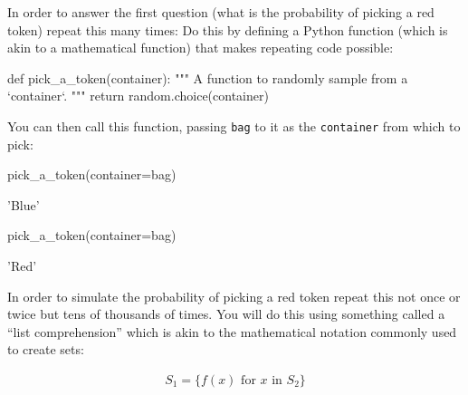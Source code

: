 \begin{pyin}
\end{pyin}





In order to answer the first question (what is the probability of picking a red
token) repeat this many times:
Do this by defining a Python function (which is akin to a mathematical
function) that makes repeating code possible:




\begin{pyin}
def pick_a_token(container):
    """
    A function to randomly sample from a `container`.
    """
    return random.choice(container)
\end{pyin}


You can then call this function, passing \texttt{bag} to it as the \texttt{container} from
which to pick:

\begin{pyin}
pick_a_token(container=bag)
\end{pyin}





\begin{raw}
'Blue'
\end{raw}









\begin{pyin}
pick_a_token(container=bag)
\end{pyin}





\begin{raw}
'Red'
\end{raw}






In order to simulate the probability of picking a red token repeat
this not once or twice but tens of thousands of times. You will do this using
something called a ``list comprehension'' which is akin to the mathematical
notation commonly used to create sets:

\begin{equation*}
\begin{split}
    S_1 = \{f(x)\text{ for }x\text{ in }S_2\}
\end{split}
\end{equation*}


